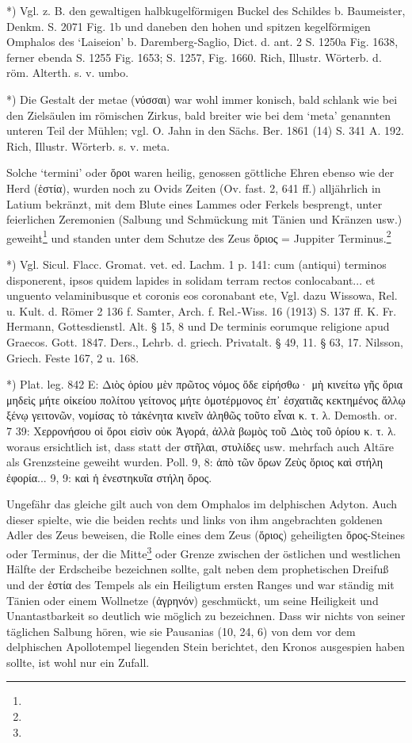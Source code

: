 \documentclass[a4paper, 11pt, oneside]{article}
\begin{document}
*) Vgl. z. B. den gewaltigen halbkugelförmigen Buckel des Schildes b. Baumeister, Denkm. S. 2071 Fig. 1b und daneben den hohen und spitzen kegelförmigen Omphalos des `Laiseion' b. Daremberg-Saglio, Dict. d. ant. 2 S. 1250a Fig. 1638, ferner ebenda S. 1255 Fig. 1653; S. 1257, Fig. 1660. Rich, Illustr. Wörterb. d. röm. Alterth. s. v. umbo.

*) Die Gestalt der metae (νύσσαι) war wohl immer konisch, bald schlank wie bei den Zielsäulen im römischen Zirkus, bald breiter wie bei dem `meta' genannten unteren Teil der Mühlen; vgl. O. Jahn in den Sächs. Ber. 1861 (14) S. 341 A. 192. Rich, Illustr. Wörterb. s. v. meta.

Solche `termini' oder ὅροι waren heilig, genossen göttliche Ehren ebenso wie der Herd (ἑστία), wurden noch zu Ovids Zeiten (Ov. fast. 2, 641 ff.) alljährlich in Latium bekränzt, mit dem Blute eines Lammes oder Ferkels besprengt, unter feierlichen Zeremonien (Salbung und Schmückung mit Tänien und Kränzen usw.) geweiht\footnote{} und standen unter dem Schutze des Zeus ὅριος = Juppiter Terminus.\footnote{}

*) Vgl. Sicul. Flacc. Gromat. vet. ed. Lachm. 1 p. 141: cum (antiqui) terminos disponerent, ipsos quidem lapides in solidam terram rectos conlocabant... et unguento velaminibusque et coronis eos coronabant ete, Vgl. dazu Wissowa, Rel. u. Kult. d. Römer 2 136 f. Samter, Arch. f. Rel.-Wiss. 16 (1913) S. 137 ff. K. Fr. Hermann, Gottesdienstl. Alt. § 15, 8 und De terminis eorumque religione apud Graecos. Gott. 1847. Ders., Lehrb. d. griech. Privatalt. § 49, 11. § 63, 17. Nilsson, Griech. Feste 167, 2 u. 168.

*) Plat. leg. 842 E: Διὸς ὁρίου μὲν πρῶτος νόμος ὅδε εἰρήσθω· μὴ κινείτω γῆς ὅρια μηδεὶς μήτε οἰκείου πολίτου γείτονος μήτε ὁμοτέρμονος ἐπ᾽ ἐσχατιᾶς κεκτημένος ἄλλῳ ξένῳ γειτονῶν, νομίσας τὸ τἀκένητα κινεῖν ἀληθῶς τοῦτο εἶναι κ. τ. λ. Demosth. or. 7 39: Χερρονήσου οἱ ὅροι εἰσὶν οὐκ Ἀγορά, ἀλλὰ βωμὸς τοῦ Διὸς τοῦ ὁρίου κ. τ. λ. woraus ersichtlich ist, dass statt der στῆλαι, στυλίδες usw. mehrfach auch Altäre als Grenzsteine geweiht wurden. Poll. 9, 8: ἀπὸ τῶν ὅρων Ζεὺς ὅριος καὶ στήλη ἐφορία... 9, 9: καὶ ἡ ἐνεστηκυῖα στήλη ὅρος.

Ungefähr das gleiche gilt auch von dem Omphalos im delphischen Adyton. Auch dieser spielte, wie die beiden rechts und links von ihm angebrachten goldenen Adler des Zeus beweisen, die Rolle eines dem Zeus (ὅριος) geheiligten ὅρος-Steines oder Terminus, der die Mitte\footnote{} oder Grenze zwischen der östlichen und westlichen Hälfte der Erdscheibe bezeichnen sollte, galt neben dem prophetischen Dreifuß und der ἑστία des Tempels als ein Heiligtum ersten Ranges und war ständig mit Tänien oder einem Wollnetze (ἀγρηνόν) geschmückt, um seine Heiligkeit und Unantastbarkeit so deutlich wie möglich zu bezeichnen. Dass wir nichts von seiner täglichen Salbung hören, wie sie Pausanias (10, 24, 6) von dem vor dem delphischen Apollotempel liegenden Stein berichtet, den Kronos ausgespien haben sollte, ist wohl nur ein Zufall.
\end{document}
